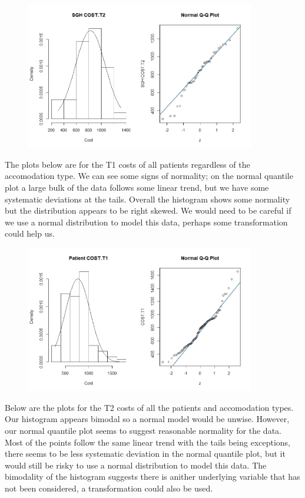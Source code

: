 \documentclass[]{article}
\begin{document}
\begin{figure}[H]
\centering
\includegraphics[width=10cm]{RStudio/jpeg/Norm_SGH_T2.jpeg}
\end{figure}
\newpage
The plots below are for the T1 costs of all patients regardless of the accomodation type. We can see some signs of normality; on the normal quantile plot a large bulk of the data follows some linear trend, but we have some systematic deviations at the tails. Overall the histogram shows some normality but the distribution appears to be right skewed. We would need to be careful if we use a normal distribution to model this data, perhaps some transformation could help us.
\begin{figure}[H]
\centering
\includegraphics[width=10cm]{RStudio/jpeg/Norm_T1.jpeg}
\end{figure}
Below are the plots for the T2 costs of all the patients and accomodation types. Our histogram appears bimodal so a normal model would be unwise. However, our normal quantile plot seems to suggest reasonable normality for the data. Most of the points follow the same linear trend with the tails being exceptions, there seems to be less systematic deviation in the normal quantile plot, but it would still be risky to use a normal distribution to model this data. The bimodality of the histogram suggests there is anither underlying variable that has not been considered, a transformation could also be used.
\end{document}
